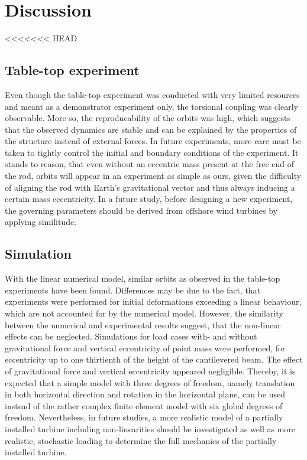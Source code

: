 \documentclass{article}
\begin{document}
\section{Discussion}
\label{sec:discussion}

<<<<<<< HEAD
\subsection{Table-top experiment}

Even though the table-top experiment was conducted with very limited resources and meant as a demonstrator experiment only, the torsional coupling was clearly observable. More so, the reproducability of the orbits was high, which suggests that the observed dynamics are stable and can be explained by the properties of the structure instead of external forces. In future experiments, more care must be taken to tightly control the initial and boundary conditions of the experiment. It stands to reason, that even without an eccentric mass present at the free end of the rod, orbits will appear in an experiment as simple as ours, given the difficulty of aligning the rod with Earth's gravitational vector and thus always inducing a certain mass eccentricity. In a future study, before designing a new experiment, the governing parameters should be derived from offshore wind turbines by applying similitude. 

\subsection{Simulation}

With the linear numerical model, similar orbits as observed in the table-top experiments have been found. Differences may be due to the fact, that experiments were performed for initial deformations exceeding a linear behaviour, which are not accounted for by the numerical model. However, the similarity between the numerical and experimental results suggest, that the non-linear effects can be neglected. Simulations for load cases with- and without gravitational force and vertical eccentricity of point mass were performed, for eccentricity up to one thirtienth of the height of the cantilevered beam. The effect of  gravitational force and vertical eccentricity appeared negligible. Thereby, it is expected that a simple model with three degrees of freedom, namely translation in both horizontal direction and rotation in the horizontal plane, can be used instead of the rather complex finite element model with six global degrees of freedom. Nevertheless, in future studies, a more realistic model of a partially installed turbine including non-linearities should be investigated as well as more realistic, stochastic loading to determine the full mechanics of the partially installed turbine.
\end{document}
